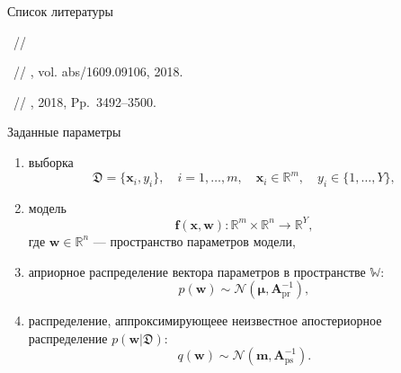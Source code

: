 \documentclass[9pt,pdf,hyperref={unicode}]{beamer}
\begin{document}
	\begin{frame}{Список литературы}
		\begin{thebibliography}{1}
			
			\textsc{}
			
			\textbf{}~//
			
			\textsc{}
			
			\textbf{}~//
			, vol. abs/1609.09106, 2018.
			
			\textsc{}
			
			\textbf{}~//
			, 2018, Pp.\, 3492--3500.
			
		\end{thebibliography}
		
	\end{frame}

\begin{frame}{Заданные параметры}
\begin{enumerate}
    \item выборка 
    $$\mathfrak{D} = \{ \mathbf{x}_i, y_i\}, \quad i = 1,\dots, m, \quad \mathbf{x}_i \in \mathbb{R}^m, \quad y_i \in \{1,\dots,Y\}, $$
    \item модель
    $$\mathbf{f}(\mathbf{x},\mathbf{w}):\mathbb{R}^m \times \mathbb{R}^n \longrightarrow \mathbb{R}^Y,$$
     где $\mathbf{w} \in \mathbb{R}^n$ --- пространство параметров модели,
    \item априорное распределение вектора параметров в пространстве $\mathbb{W}$:
    $$p(\mathbf{w}) \sim \mathcal{N} (\boldsymbol{\mu}, \mathbf{A}_{\text{pr}}^{-1}),$$
    \item распределение, аппроксимирующеее неизвестное апостериорное распределение $p(\mathbf{w}| \mathfrak{D})$:
    $$q(\mathbf{w}) \sim \mathcal{N} (\mathbf{m},\mathbf{A}_{\text{ps}}^{-1}).$$
\end{enumerate}




\end{frame}
\end{document}
